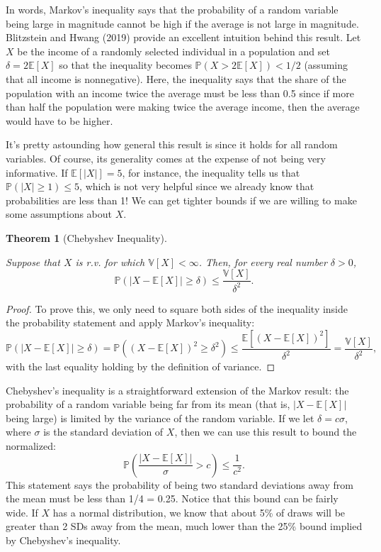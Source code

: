 \documentclass[
  letterpaper,
  DIV=11,
  numbers=noendperiod]{scrreprt}
\newcommand{\E}{\mathbb{E}}
\newcommand{\V}{\mathbb{V}}
\renewcommand{\P}{\mathbb{P}}
\theoremstyle{definition}
\theoremstyle{definition}
\theoremstyle{plain}
\newtheorem{theorem}{Theorem}[chapter]
\theoremstyle{remark}
\begin{document}
In words, Markov's inequality says that the probability of a random
variable being large in magnitude cannot be high if the average is not
large in magnitude. Blitzstein and Hwang (2019) provide an excellent
intuition behind this result. Let \(X\) be the income of a randomly
selected individual in a population and set \(\delta = 2\E[X]\) so that
the inequality becomes \(\P(X > 2\E[X]) < 1/2\) (assuming that all
income is nonnegative). Here, the inequality says that the share of the
population with an income twice the average must be less than 0.5 since
if more than half the population were making twice the average income,
then the average would have to be higher.

It's pretty astounding how general this result is since it holds for all
random variables. Of course, its generality comes at the expense of not
being very informative. If \(\E[|X|] = 5\), for instance, the inequality
tells us that \(\P(|X| \geq 1) \leq 5\), which is not very helpful since
we already know that probabilities are less than 1! We can get tighter
bounds if we are willing to make some assumptions about \(X\).

\begin{theorem}[Chebyshev
Inequality]\protect\hypertarget{thm-chebyshev}{}\label{thm-chebyshev}

Suppose that \(X\) is r.v. for which \(\V[X] < \infty\). Then, for every
real number \(\delta > 0\), \[
\P(|X-\E[X]| \geq \delta) \leq \frac{\V[X]}{\delta^2}.
\]

\end{theorem}

\begin{proof}

To prove this, we only need to square both sides of the inequality
inside the probability statement and apply Markov's inequality: \[
\P\left( |X - \E[X]| \geq \delta \right) = \P((X-\E[X])^2 \geq \delta^2) \leq \frac{\E[(X - \E[X])^2]}{\delta^2} = \frac{\V[X]}{\delta^2},
\] with the last equality holding by the definition of variance.

\end{proof}

Chebyshev's inequality is a straightforward extension of the Markov
result: the probability of a random variable being far from its mean
(that is, \(|X-\E[X]|\) being large) is limited by the variance of the
random variable. If we let \(\delta = c\sigma\), where \(\sigma\) is the
standard deviation of \(X\), then we can use this result to bound the
normalized: \[
\P\left(\frac{|X - \E[X]|}{\sigma} > c \right) \leq \frac{1}{c^2}.
\] This statement says the probability of being two standard deviations
away from the mean must be less than 1/4 = 0.25. Notice that this bound
can be fairly wide. If \(X\) has a normal distribution, we know that
about 5\% of draws will be greater than 2 SDs away from the mean, much
lower than the 25\% bound implied by Chebyshev's inequality.
\end{document}

